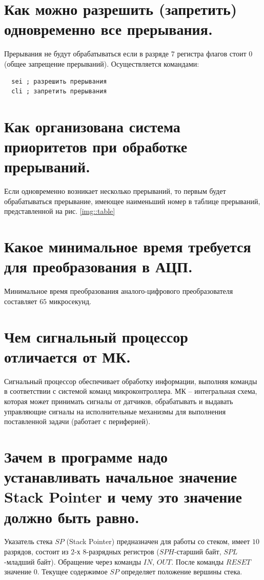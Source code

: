 \section{Как можно разрешить (запретить) одновременно все прерывания.}
Прерывания не будут обрабатываться если в разряде $7$ регистра флагов 
стоит $0$ (общее запрещение прерываний). Осуществляется командами:
\begin{verbatim}
  sei ; разрешить прерывания
  cli ; запретить прерывания
\end{verbatim}

\section{Как организована система приоритетов при обработке прерываний. }
Если одновременно возникает несколько прерываний, то первым будет 
обрабатываться прерывание, имеющее наименьший номер в таблице прерываний, представленной на рис. \ref{img::table}

\section{Какое минимальное время требуется для преобразования в АЦП.}
Минимальное время преобразования аналого-цифрового преобразователя 
составляет $65$ микросекунд.

\section{Чем сигнальный процессор отличается от МК.}

Сигнальный процессор обеспечивает обработку информации, выполняя команды в соответствии с 
системой команд микроконтроллера. 
МК – интегральная схема, которая может принимать сигналы от датчиков, обрабатывать и 
выдавать управляющие сигналы на исполнительные механизмы для выполнения поставленной задачи 
(работает с периферией).

\section{Зачем в программе надо устанавливать начальное значение Stack Pointer и чему это значение должно быть равно.}

Указатель стека $SP$ (Stack Pointer) предназначен для работы со стеком, имеет $10$ разрядов, 
состоит из $2$-х $8$-разрядных регистров ($SPH$-старший байт, $SPL$-младший байт). Обращение 
через команды $IN$, $OUT$. После команды $RESET$ значение $0$. 
Текущее содержимое $SP$ определяет положение вершины стека. 

